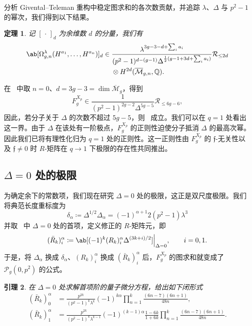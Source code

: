\documentclass{amsart}
\newtheorem{thm}{定理}[section]
\newtheorem{lem}[thm]{引理}
\theoremstyle{definition}
\theoremstyle{remark}
\theoremstyle{plain}
\theoremstyle{definition}
\theoremstyle{remark}
\newcommand{\Q}{\mathbb{Q}}
\newcommand{\Mbar}{\overline{\mathcal{M}}}
\newcommand{\mc}[1]{\mathcal{#1}}
\newcommand{\mf}[1]{\mathfrak{#1}}
\newcommand{\1}{\mathbf{1}}
\newcommand{\2}{\mathbf{2}}
\newcommand{\3}{\mathbf{3}}
\begin{document}
分析 Givental--Teleman 重构中稳定图求和的各次数贡献，并追踪 \(\lambda\)、\(\Delta\) 与 \(p^2-1\) 的幂次，我们得到以下结果。

\begin{thm}%
\label{thm:local P1 reconstruction}
    记 \([\,\cdot\,]_d\) 为余维数 \(d\) 的分量，我们有
    \begin{align*}
        \ab[\Omega^{\lambda}_{g,n}(H^{a_1},\ldots,H^{a_n})]_d \in{}& \frac{\lambda^{3g-3-d+\sum_i a_i}}{(p^2-1)^{d-(g-1)}\Delta^{\frac{1}{2}(g-1+3d+\sum_i a_i)}}\mc{R}_{\leq 2d} \\
        &\otimes H^{2d}(\Mbar_{g,n},\Q).
    \end{align*}
\end{thm}

在~ 中取 \(n=0\)、\(d = 3g-3 = \dim \Mbar_g\)，得到
\[ F_g^{X_p} \in \frac{1}{(p^2-1)^{2g-2}\Delta^{5g-5}}\mc{R}_{\leq 6g-6}, \]
因此，若分子关于 \(\Delta\) 的次数不超过 \(5g-5\)，则~ 成立。我们可以在 \(q=1\) 处看出这一界。由于 \(\Delta\) 在该处有一阶极点，\(F_g^{X_p}\) 的正则性迫使分子抵消 \(\Delta\) 的最高次幂。因此我们已将有理性化归为 \(q=1\) 处的正则性。这一正则性由 \(F_g^{X_p}\) 的 \(\mf{f}\)-无关性以及 \(\mf{f} \neq 0\) 时 \(R\)-矩阵在 \(q \to 1\) 下极限的存在性共同推出。

\subsection{\(\Delta = 0\) 处的极限}%
\label{sub:The limit Delta = 0}

为确定余下的常数项，我们现在研究 \(\Delta = 0\) 处的极限，这正是双尺度极限。我们将典范长度重标度为
\[ \delta_{\alpha} \coloneqq \Delta^{1/2}\Delta_{\alpha} = (-1)^{\alpha+1}2(p^2-1)\lambda^3 \]
并取~ 中 \(\Delta = 0\) 处的首项，定义修正的 \(R\)-矩阵元，即
\[ (\bar{R}_k)_i^{\alpha} \coloneqq \ab[(-1)^k (R_k)_i^{\alpha}\Delta^{(3k+i)/2}]\Big|_{\Delta=0}, \qquad i = 0,1. \]
于是，将 \(\Delta_{\alpha}\) 换成 \(\delta_{\alpha}\)、\((R_k)_i^{\alpha}\) 换成 \((\bar{R}_k)_i^{\alpha}\) 后，\(F_g^{X_p}\) 的图求和就变成了 \(\mc{P}_g(0,p^2)\) 的公式。

\begin{lem}%
\label{lem:R matrix at Delta zero}
    在 \(\Delta = 0\) 处求解首项阶的量子微分方程，给出如下闭形式
    \begin{align*}
        (\bar{R}_k)_0^{\alpha} &= \frac{p^{2k}}{(p^2-1)^k\lambda^k}(-1)^{k\alpha}\prod_{n=1}^k \frac{(6n-7)(6n+1)}{48n}, \\
        (\bar{R}_k)_1^{\alpha} &= \frac{p^{2k}}{(p^2-1)^k \lambda^{k-1}}(-1)^{(k-1)\alpha}\frac{1-6k}{1+6k}\prod_{n=1}^k \frac{(6n-7)(6n+1)}{48n}.
    \end{align*}
\end{lem}
\end{document}
